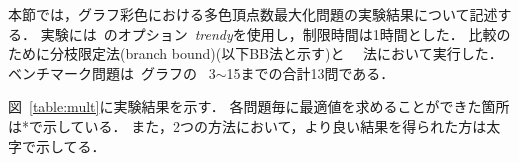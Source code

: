 本節では，グラフ彩色における多色頂点数最大化問題の実験結果について記述する．
実験には~{\clingo}のオプション~\textit{trendy}を使用し，制限時間は1時間とした．
比較のために分枝限定法(branch bound)(以下BB法と示す)と
~~法において実行した．
ベンチマーク問題は~グラフの
~3$\sim$15までの合計13問である．

図~\ref{table:mult}に実験結果を示す．
各問題毎に最適値を求めることができた箇所は*で示している．
また，2つの方法において，より良い結果を得られた方は太字で示してる．

